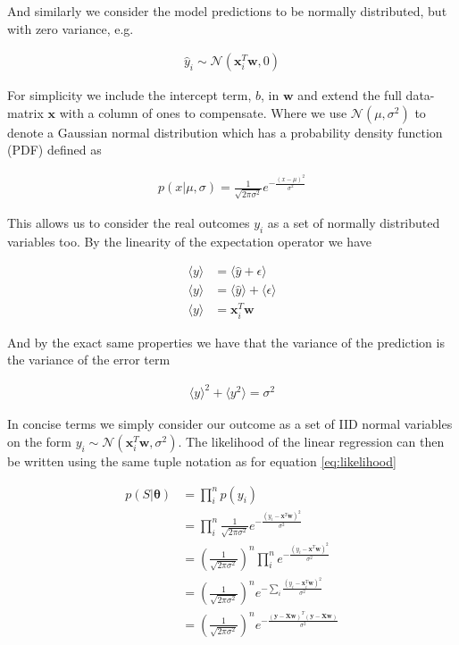 \noindent And similarly we consider the model predictions to be normally distributed, but with zero variance, e.g.

\begin{align}
\hat{y}_i \sim \mathcal{N}(\mathbf{x}_i^T\mathbf{w}, 0)
\end{align}

\noindent For simplicity we include the intercept term, $b$,  in $\mathbf{w}$ and extend the full data-matrix $\mathbf{x}$ with a column of ones to compensate. Where we use $\mathcal{N}(\mu, \sigma^2)$ to denote a Gaussian normal distribution which has a probability density function (PDF) defined as 

\begin{align}
p(x | \mu, \sigma) = \frac{1}{\sqrt{2\pi \sigma^2}}e^{-\frac{(x - \mu)^2}{\sigma^2}}
\end{align}

\noindent This allows us to consider the real outcomes $y_i$ as a set of normally distributed variables too. By the linearity of the expectation operator we have 

\begin{align}
\langle y \rangle &= \langle \hat{y} + \epsilon \rangle  \\
\langle y \rangle &= \langle \hat{y} \rangle + \langle \epsilon \rangle \\
\langle y \rangle &= \mathbf{x}_i^T\mathbf{w}
\end{align}

\noindent And by the exact same properties we have that the variance of the prediction is the variance of the error term 

\begin{align}
\langle y\rangle^2 + \langle y^2\rangle = \sigma^2
\end{align}

\noindent In concise terms we simply consider our outcome as a set of IID normal variables on the form $y_i \sim \mathcal{N}(\mathbf{x}_i^T\mathbf{w}, \sigma^2)$. The likelihood of the linear regression can then be written using the same tuple notation as for equation \ref{eq:likelihood}

\begin{align}
p(S|\mathbf{\theta}) &= \prod_i^n p(y_i) \\
&= \prod_i^n \frac{1}{\sqrt{2\pi \sigma^2}}e^{-\frac{(y_i - \mathbf{x}^T\mathbf{w})^2}{\sigma^2}} \\
&= \left(\frac{1}{\sqrt{2\pi \sigma^2}} \right)^n \prod_i^n e^{-\frac{(y_i - \mathbf{x}^T\mathbf{w})^2}{\sigma^2}} \\
&= \left(\frac{1}{\sqrt{2\pi \sigma^2}} \right)^n  e^{-\sum_i\frac{(y_i - \mathbf{x}^T_i\mathbf{w})^2}{\sigma^2}} \\
&= \left(\frac{1}{\sqrt{2\pi \sigma^2}} \right)^n  e^{-\frac{(\mathbf{y} - \mathbf{X}\mathbf{w})^T(\mathbf{y} - \mathbf{X}\mathbf{w})}{\sigma^2}} 
\end{align}

